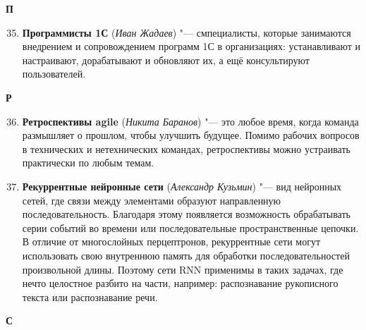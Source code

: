 \begin{flushleft} \large\textbf{П} \end{flushleft}
\begin{enumerate}
\setcounter{enumi}{34}
 
    \item \textbf{Программисты 1С} (\textit{Иван Жадаев}) "--- 
    смпециалисты, которые занимаются внедрением и сопровождением программ 1С в организациях: устанавливают и настраивают, дорабатывают и обновляют их, а ещё консультируют пользователей.

\end{enumerate}

\begin{flushleft} \large\textbf{Р} \end{flushleft}
\begin{enumerate}

\setcounter{enumi}{35}
 
    \item \textbf{Ретроспективы agile} (\textit{Никита Баранов}) "--- 
    это любое время, когда команда размышляет о прошлом, чтобы улучшить будущее. Помимо рабочих вопросов в технических и нетехнических командах, ретроспективы можно устраивать практически по любым темам.

    \item \textbf{Рекуррентные нейронные сети} (\textit{Александр Кузьмин}) "--- 
    вид нейронных сетей, где связи между элементами образуют направленную последовательность. Благодаря этому появляется возможность обрабатывать серии событий во времени или последовательные пространственные цепочки. В отличие от многослойных перцептронов, рекуррентные сети могут использовать свою внутреннюю память для обработки последовательностей произвольной длины. Поэтому сети RNN применимы в таких задачах, где нечто целостное разбито на части, например: распознавание рукописного текста или распознавание речи.
    
\end{enumerate}

\begin{flushleft} \large\textbf{С} \end{flushleft}

